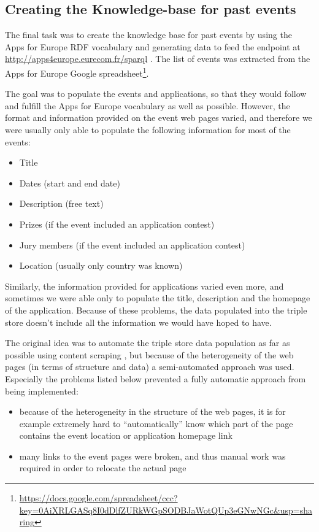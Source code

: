 \subsection{Creating the Knowledge-base for past events}
The final task was to create the knowledge base for past events by using the Apps for Europe RDF vocabulary and generating data to feed the endpoint at \url{http://apps4europe.eurecom.fr/sparql} . The list of events was extracted from the Apps for Europe Google spreadsheet\footnote{\url{https://docs.google.com/spreadsheet/ccc?key=0AiXRLGASq8I0dDlfZURkWGpSODBJaWotQUp3eGNwNGc&usp=sharing}}.

The goal was to populate the events and applications, so that they would follow and fulfill the Apps for Europe vocabulary as well as possible. However, the format and information provided on the event web pages varied, and therefore we were usually only able to populate the following information for most of the events:
\begin{itemize}
\item Title
\item Dates (start and end date)
\item Description (free text)
\item Prizes (if the event included an application contest)
\item Jury members (if the event included an application contest)
\item Location (usually only country was known)
\end{itemize}

Similarly, the information provided for applications varied even more, and sometimes we were able only to populate the title, description and the homepage of the application. Because of these problems, the data populated into the triple store doesn't include all the information we would have hoped to have.

The original idea was to automate the triple store data population as far as possible using content scraping , but because of the heterogeneity of the web pages (in terms of structure and data)  a semi-automated approach was used. Especially the problems listed below prevented a fully automatic approach from being implemented:

\begin{itemize}
\item because of the heterogeneity in the structure of the web pages, it is for example extremely hard to ``automatically'' know which part of the page contains the event location or application homepage link
\item many links to the event pages were broken, and thus manual work was required in order to relocate the actual page
\end{itemize}

